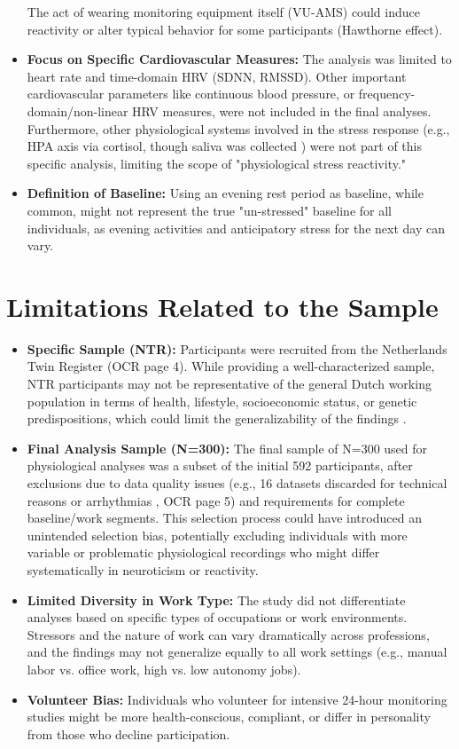 \documentclass[11pt, a4paper]{report}
\begin{document}
\begin{itemize}
        The act of wearing monitoring equipment itself (VU-AMS) could induce reactivity or alter typical behavior for some participants (Hawthorne effect).
    \item \textbf{Focus on Specific Cardiovascular Measures:} The analysis was limited to heart rate and time-domain HRV (SDNN, RMSSD). Other important cardiovascular parameters like continuous blood pressure, or frequency-domain/non-linear HRV measures, were not included in the final analyses. Furthermore, other physiological systems involved in the stress response (e.g., HPA axis via cortisol, though saliva was collected \cite{ThesisTempPDF}) were not part of this specific analysis, limiting the scope of "physiological stress reactivity."
    \item \textbf{Definition of Baseline:} Using an evening rest period as baseline, while common, might not represent the true "un-stressed" baseline for all individuals, as evening activities and anticipatory stress for the next day can vary.
\end{itemize}

\section{Limitations Related to the Sample}
\label{sec:limitations_sample_chap} %

\begin{itemize}
    \item \textbf{Specific Sample (NTR):} Participants were recruited from the Netherlands Twin Register \cite{ThesisTempPDF} (OCR page 4). While providing a well-characterized sample, NTR participants may not be representative of the general Dutch working population in terms of health, lifestyle, socioeconomic status, or genetic predispositions, which could limit the generalizability of the findings \cite{BoomsmaEtAl2006_NTR}.
    \item \textbf{Final Analysis Sample (N=300):} The final sample of N=300 used for physiological analyses was a subset of the initial 592 participants, after exclusions due to data quality issues (e.g., 16 datasets discarded for technical reasons or arrhythmias \cite{ThesisTempPDF}, OCR page 5) and requirements for complete baseline/work segments. This selection process could have introduced an unintended selection bias, potentially excluding individuals with more variable or problematic physiological recordings who might differ systematically in neuroticism or reactivity.
    \item \textbf{Limited Diversity in Work Type:} The study did not differentiate analyses based on specific types of occupations or work environments. Stressors and the nature of work can vary dramatically across professions, and the findings may not generalize equally to all work settings (e.g., manual labor vs. office work, high vs. low autonomy jobs).
    \item \textbf{Volunteer Bias:} Individuals who volunteer for intensive 24-hour monitoring studies might be more health-conscious, compliant, or differ in personality from those who decline participation.
\end{itemize}
\end{document}

